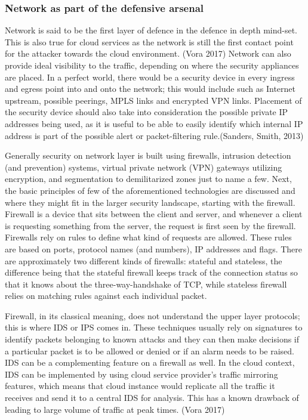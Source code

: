 \documentclass{article}
\begin{document}
\subsubsection{Network as part of the defensive arsenal}
Network is said to be the first layer of defence in the defence in depth mind-set. This is also true for cloud services as the network is still the first contact point for the attacker towards the cloud environment. (Vora 2017)
Network can also provide ideal visibility to the traffic, depending on where the security appliances are placed. In a perfect world, there would be a security device in every ingress and egress point into and onto the network; this would include such as Internet upstream, possible peerings, MPLS links and encrypted VPN links. Placement of the security device should also take into consideration the possible private IP addresses being used, as it is useful to be able to easily identify which internal IP address is part of the possible alert or packet-filtering rule.(Sanders, Smith, 2013)
\par
Generally security on network layer is built using firewalls, intrusion detection (and prevention) systems, virtual private network (VPN) gateways utilizing encryption, and segmentation to demilitarized zones just to name a few. Next, the basic principles of few of the aforementioned technologies are discussed and where they might fit in the larger security landscape, starting with the firewall. Firewall is a device that sits between the client and server, and whenever a client is requesting something from the server, the request is first seen by the firewall. Firewalls rely on rules to define what kind of requests are allowed. These rules are based on ports, protocol names (and numbers), IP addresses and flags. There are approximately two different kinds of firewalls: stateful and stateless, the difference being that the stateful firewall keeps track of the connection status so that it knows about the three-way-handshake of TCP, while stateless firewall relies on matching rules against each individual packet.
\par
Firewall, in its classical meaning, does not understand the upper layer protocols; this is where IDS or IPS comes in. These techniques usually rely on signatures to identify packets belonging to known attacks and they can then make decisions if a particular packet is to be allowed or denied or if an alarm needs to be raised. IDS can be a complementing feature on a firewall as well. In the cloud context, IDS can be implemented by using cloud service provider's traffic mirroring features, which means that cloud instance would replicate all the traffic it receives and send it to a central IDS for analysis. This has a known drawback of leading to large volume of traffic at peak times. (Vora 2017)
\end{document}
